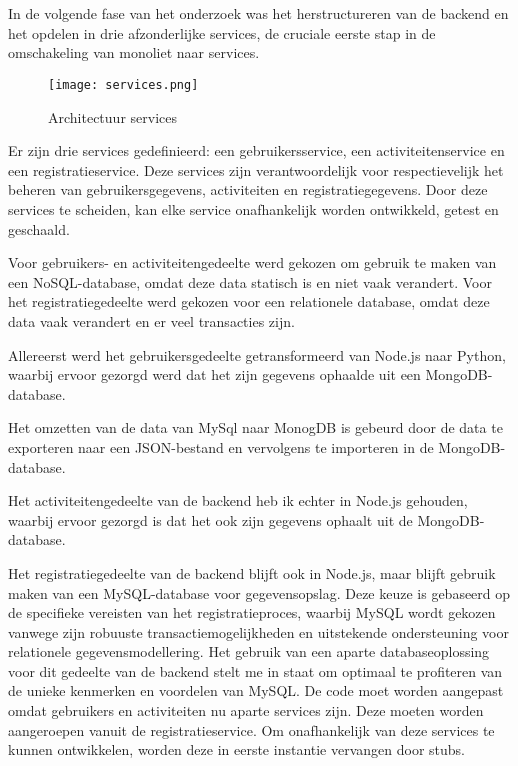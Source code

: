 \chapter{}
\label{ch:opsplitsen-backend}

In de volgende fase van het onderzoek was het herstructureren van de backend en het opdelen in drie afzonderlijke services, de cruciale eerste stap in de omschakeling van monoliet naar services. 
\begin{figure}
	\centering	
	\texttt{[image: services.png]} 
	\caption{Architectuur services} 
	\label{fig:services} 
\end{figure}
\FloatBarrier

Er zijn drie services gedefinieerd: een gebruikersservice, een activiteitenservice en een registratieservice. Deze services zijn verantwoordelijk voor respectievelijk het beheren van gebruikersgegevens, activiteiten en registratiegegevens. Door deze services te scheiden, kan elke service onafhankelijk worden ontwikkeld, getest en geschaald.

Voor gebruikers- en activiteitengedeelte werd gekozen om gebruik te maken van een NoSQL-database, omdat deze data statisch is en niet vaak verandert. Voor het registratiegedeelte werd gekozen voor een relationele database, omdat deze data vaak verandert en er veel transacties zijn.

Allereerst werd het gebruikersgedeelte getransformeerd van Node.js naar Python, waarbij ervoor gezorgd werd dat het zijn gegevens ophaalde uit een MongoDB-database.

Het omzetten van de data van MySql naar MonogDB is gebeurd door de data te exporteren naar een JSON-bestand en vervolgens te importeren in de MongoDB-database.

Het activiteitengedeelte van de backend heb ik echter in Node.js gehouden, waarbij ervoor gezorgd is dat het ook zijn gegevens ophaalt uit de MongoDB-database.

Het registratiegedeelte van de backend blijft ook in Node.js, maar blijft gebruik maken van een MySQL-database voor gegevensopslag. Deze keuze is gebaseerd op de specifieke vereisten van het registratieproces, waarbij MySQL wordt gekozen vanwege zijn robuuste transactiemogelijkheden en uitstekende ondersteuning voor relationele gegevensmodellering. Het gebruik van een aparte databaseoplossing voor dit gedeelte van de backend stelt me in staat om optimaal te profiteren van de unieke kenmerken en voordelen van MySQL. De code moet worden aangepast omdat gebruikers en activiteiten nu aparte services zijn. Deze moeten worden aangeroepen vanuit de registratieservice. Om onafhankelijk van deze services te kunnen ontwikkelen, worden deze in eerste instantie vervangen door stubs.

